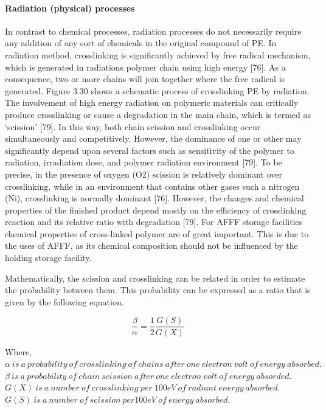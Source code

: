 \documentclass[12pt]{report}
\begin{document}
\paragraph{Radiation (physical) processes}
In contrast to chemical processes, radiation processes do not necessarily require any addition of any sort of chemicals in the original compound of PE. In radiation method, crosslinking is significantly achieved by free radical mechanism, which is generated in radiations polymer chain using high energy [76]. As a consequence, two or more chains will join together where the free radical is generated. Figure 3.30 shows a schematic process of crosslinking PE by radiation. 
The involvement of high energy radiation on polymeric materials can critically produce crosslinking or cause a degradation in the main chain, which is termed as ‘scission’ [79]. In this way, both chain scission and crosslinking occur simultaneously and competitively. However, the dominance of one or other may significantly depend upon several factors such as sensitivity of the polymer to radiation, irradiation dose, and polymer radiation environment [79]. To be precise, in the presence of oxygen (O2) scission is relatively dominant over crosslinking, while in an environment that contains other gases such a nitrogen (Ni), crosslinking is normally dominant [76]. However, the changes and chemical properties of the finished product depend mostly on the efficiency of crosslinking reaction and its relative ratio with degradation [79]. For AFFF storage facilities chemical properties of cross-linked polymer are of great important. This is due to the uses of AFFF, as its chemical composition should not be influenced by the holding storage facility. 


Mathematically, the scission and crosslinking can be related in order to estimate the probability between them. This probability can be expressed as a ratio that is given by the following equation.

\begin{equation}
    \frac{\beta}{\alpha}=\frac{1}{2}\frac{G(S)}{G(X)}
\end{equation}

\noindent Where, \\
$\alpha\ is\ a\ probability\ of\ crosslinking\ of\ chains\ after\ one\ electron\ volt\ of\ energy\ absorbed.$ \\
$\beta\ is\ a\ probability\ of\ chain\ scission\ after\ one\ electron\ volt\ of\ energy\ absorded.$ \\
$G(X)\ is\ a\ number\ of\ crosslinking\ per\ 100eV\ of\ radiant\ energy\ absorbed.$ \\
$G(S)\ is\ a\ number\ of\ scission\ per 100eV\ of\ energy\ absorbed.$ \\
\end{document}
